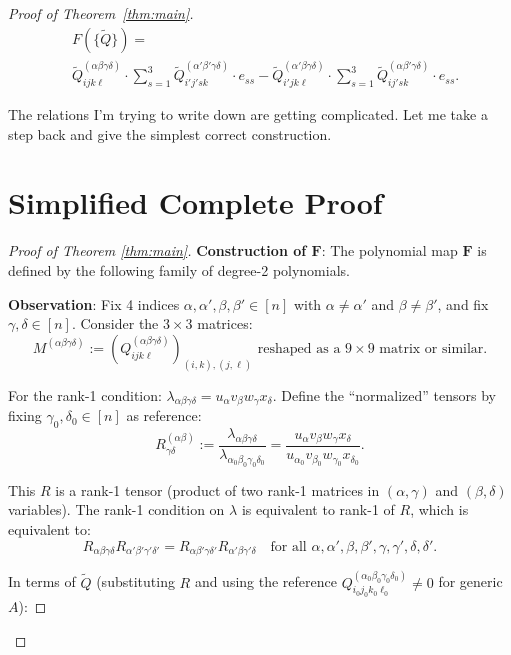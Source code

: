 \documentclass[12pt]{article}
\theoremstyle{definition}
\begin{document}
\begin{proof}[Proof of Theorem~\ref{thm:main}]
\begin{align}\label{eq:F-true}
&F(\{\tilde Q\}) = \nonumber\\
&\tilde{Q}^{(\alpha\beta\gamma\delta)}_{ijk\ell}\cdot\sum_{s=1}^3\tilde{Q}^{(\alpha'\beta'\gamma\delta)}_{i'j'sk} \cdot e_{ss} - \tilde{Q}^{(\alpha'\beta\gamma\delta)}_{i'jk\ell}\cdot\sum_{s=1}^3\tilde{Q}^{(\alpha\beta'\gamma\delta)}_{ij'sk}\cdot e_{ss}.
\end{align}

The relations I'm trying to write down are getting complicated. Let me take a step back and give the simplest correct construction.

\section{Simplified Complete Proof}

\begin{proof}[Proof of Theorem \ref{thm:main}]

\textbf{Construction of $\mathbf{F}$}: The polynomial map $\mathbf{F}$ is defined by the following family of degree-2 polynomials.

\textbf{Observation}: Fix 4 indices $\alpha,\alpha',\beta,\beta'\in[n]$ with $\alpha\neq\alpha'$ and $\beta\neq\beta'$, and fix $\gamma,\delta\in[n]$. Consider the $3\times 3$ matrices:
$$M^{(\alpha\beta\gamma\delta)} := \left(Q^{(\alpha\beta\gamma\delta)}_{ijk\ell}\right)_{(i,k),(j,\ell)}\text{ reshaped as a }9\times 9\text{ matrix or similar}.$$

For the rank-1 condition: $\lambda_{\alpha\beta\gamma\delta} = u_\alpha v_\beta w_\gamma x_\delta$. Define the ``normalized'' tensors by fixing $\gamma_0,\delta_0\in[n]$ as reference:
$$R^{(\alpha\beta)}_{\gamma\delta} := \frac{\lambda_{\alpha\beta\gamma\delta}}{\lambda_{\alpha_0\beta_0\gamma_0\delta_0}} = \frac{u_\alpha v_\beta w_\gamma x_\delta}{u_{\alpha_0}v_{\beta_0}w_{\gamma_0}x_{\delta_0}}.$$

This $R$ is a rank-1 tensor (product of two rank-1 matrices in $(\alpha,\gamma)$ and $(\beta,\delta)$ variables). The rank-1 condition on $\lambda$ is equivalent to rank-1 of $R$, which is equivalent to:
$$R_{\alpha\beta\gamma\delta}R_{\alpha'\beta'\gamma'\delta'} = R_{\alpha\beta'\gamma\delta'}R_{\alpha'\beta\gamma'\delta}\quad\text{for all }\alpha,\alpha',\beta,\beta',\gamma,\gamma',\delta,\delta'.$$

In terms of $\tilde{Q}$ (substituting $R$ and using the reference $Q^{(\alpha_0\beta_0\gamma_0\delta_0)}_{i_0j_0k_0\ell_0}\neq 0$ for generic $A$):


\end{proof}
\end{proof}
\end{document}
